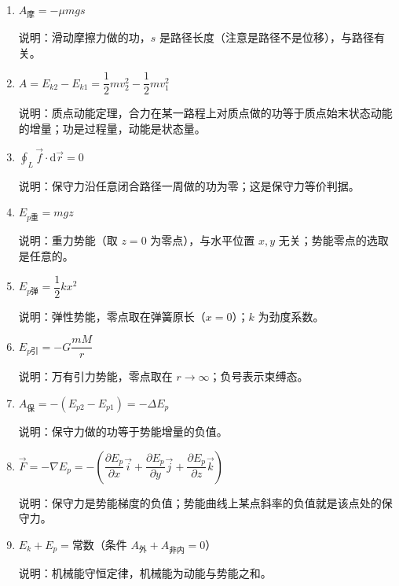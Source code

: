 \documentclass[12pt,a4paper]{ctexart}
\begin{document}
\begin{enumerate}[leftmargin=3em,label=\textbf{公式\arabic*}：,ref=公式\arabic*]
    \item $A_{\text{摩}} = -\mu mgs$

    说明：滑动摩擦力做的功，$s$ 是路径长度（注意是路径不是位移），与路径有关。

    \item $A = E_{k2} - E_{k1} = \dfrac{1}{2}mv_2^2 - \dfrac{1}{2}mv_1^2$

    说明：质点动能定理，合力在某一路程上对质点做的功等于质点始末状态动能的增量；功是过程量，动能是状态量。

    \item $\displaystyle\oint_L \vec{f}\cdot\mathrm{d}\vec{r} = 0$

    说明：保守力沿任意闭合路径一周做的功为零；这是保守力等价判据。

    \item $E_{p\text{重}} = mgz$

    说明：重力势能（取 $z=0$ 为零点），与水平位置 $x,y$ 无关；势能零点的选取是任意的。

    \item $E_{p\text{弹}} = \dfrac{1}{2}kx^2$

    说明：弹性势能，零点取在弹簧原长（$x=0$）；$k$ 为劲度系数。

    \item $E_{p\text{引}} = -G\dfrac{mM}{r}$

    说明：万有引力势能，零点取在 $r\to\infty$；负号表示束缚态。

    \item $A_{\text{保}} = -(E_{p2} - E_{p1}) = -\Delta E_p$

    说明：保守力做的功等于势能增量的负值。

    \item $\vec{F} = -\nabla E_p = -\left(\dfrac{\partial E_p}{\partial x}\vec{i} + \dfrac{\partial E_p}{\partial y}\vec{j} + \dfrac{\partial E_p}{\partial z}\vec{k}\right)$

    说明：保守力是势能梯度的负值；势能曲线上某点斜率的负值就是该点处的保守力。

    \item $E_k + E_p = \text{常数}$（条件 $A_{\text{外}} + A_{\text{非内}} = 0$）

    说明：机械能守恒定律，机械能为动能与势能之和。

\end{enumerate}
\end{document}
